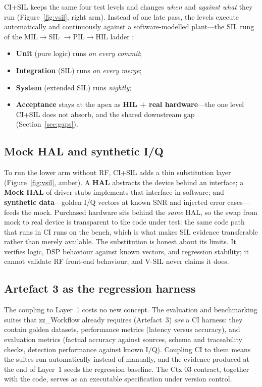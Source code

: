 \documentclass[11pt,a4paper]{article}
\begin{document}
CI+SIL keeps the same four test levels and changes \emph{when} and \emph{against what} they run
(Figure~\ref{fig:vsil}, right arm). Instead of one late pass, the levels execute automatically and
continuously against a software-modelled plant---the SIL rung of the MIL$\rightarrow$SIL
$\rightarrow$PIL$\rightarrow$HIL ladder \cite{opalrt2026,sheridan2026a}:

\begin{itemize}
  \item \textbf{Unit} (pure logic) runs \emph{on every commit};
  \item \textbf{Integration} (SIL) runs \emph{on every merge};
  \item \textbf{System} (extended SIL) runs \emph{nightly};
  \item \textbf{Acceptance} stays at the apex as \textbf{HIL + real hardware}---the one level
    CI+SIL does not absorb, and the shared downstream gap (Section~\ref{sec:gaps}).
\end{itemize}

\subsection{Mock HAL and synthetic I/Q}
\label{sec:mockhal}

To run the lower arm without RF, CI+SIL adds a thin substitution layer (Figure~\ref{fig:vsil},
amber). A \textbf{HAL} abstracts the device behind an interface; a \textbf{Mock HAL} of driver
stubs implements that interface in software; and \textbf{synthetic data}---golden I/Q vectors at
known SNR and injected error cases---feeds the mock. Purchased hardware sits behind the
\emph{same} HAL, so the swap from mock to real device is transparent to the code under test:
the same code path that runs in CI runs on the bench, which is what makes SIL evidence
transferable rather than merely available. The substitution is honest about its limits. It
verifies logic, DSP behaviour against known vectors, and regression stability; it cannot
validate RF front-end behaviour, and V-SIL never claims it does.

\subsection{Artefact 3 as the regression harness}
\label{sec:artefact3}

The coupling to Layer~1 costs no new concept. The evaluation and benchmarking suites that
zz\_Workflow already requires (Artefact~3) \emph{are} a CI harness: they contain golden datasets,
performance metrics (latency versus accuracy), and evaluation metrics (factual accuracy against
sources, schema and traceability checks, detection performance against known I/Q). Coupling CI
to them means the suites run automatically instead of manually, and the evidence produced at the
end of Layer~1 seeds the regression baseline. The Ctx 03 contract, together with the code, serves
as an executable specification under version control.
\end{document}
